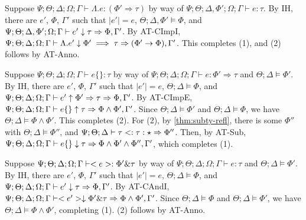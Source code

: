   \item[(T-CImpI)] Suppose
  $\Psi ; \Theta ; \Delta ; \Omega ; \Gamma \vdash \Lambda .e : (\Phi' \Rightarrow \tau)$ by way of
  $\Psi ; \Theta ; \Delta,\Phi' ; \Omega ; \Gamma \vdash e : \tau$.
  By IH, there are $e'$, $\Phi$, $\Gamma'$ such that
  $|e'| = e$,
  $\Theta ; \Delta,\Phi' \vDash \Phi$, and
  $\Psi ; \Theta ; \Delta,\Phi'; \Omega ; \Gamma \vdash e' \downarrow \tau \Rightarrow \Phi,\Gamma'$.
  By AT-CImpI,
  $\Psi ; \Theta ; \Delta ; \Omega ; \Gamma \vdash \Lambda. e' \downarrow \Phi' \implies \tau \Rightarrow (\Phi' \to \Phi),\Gamma'$.
  This completes (1), and (2) follows by AT-Anno.
  
  \item[(T-CImpE)] Suppose
  $\Psi ; \Theta ; \Delta ; \Omega ; \Gamma \vdash e \{\} : \tau$ by way of
  $\Psi ; \Theta ; \Delta ; \Omega ; \Gamma \vdash e : \Phi' \Rightarrow \tau$ and
  $\Theta ; \Delta \vDash \Phi'$.
  By IH, there are $e'$, $\Phi$, $\Gamma'$ such that
  $|e'| = e$,
  $\Theta ; \Delta \vDash \Phi$, and
  $\Psi ; \Theta ; \Delta ; \Omega ; \Gamma \vdash e' \uparrow \Phi' \Rightarrow \tau \Rightarrow \Phi,\Gamma'$.
  By AT-CImpE,
  $\Psi ; \Theta ; \Delta ; \Omega ; \Gamma \vdash e \{\} \uparrow \tau \Rightarrow \Phi \wedge \Phi',\Gamma'$.
  Since $\Theta ; \Delta \vDash \Phi'$ and $\Theta ; \Delta \vDash \Phi$, we have $\Theta ; \Delta \vDash \Phi \wedge \Phi'$.
  This completes (2). For (2),
  by \autoref{thm:subty-refl}, there is some $\Phi''$ with
  $\Theta ; \Delta \vDash \Phi''$, and
  $\Psi ; \Theta ; \Delta \vdash \tau <: \tau : \star \Rightarrow \Phi''$.
  Then, by AT-Sub,
  $\Psi ; \Theta ; \Delta ; \Omega ; \Gamma \vdash e \{\} \downarrow \tau \Rightarrow \Phi \wedge \Phi' \wedge \Phi'',\Gamma'$,
  which completes (1).
  
  \item[(T-CAndI)] Suppose
  $\Psi ; \Theta ; \Delta ; \Omega ; \Gamma \vdash <e> : \Phi' \& \tau$ by way of
  $\Psi ; \Theta ; \Delta ; \Omega ; \Gamma \vdash e : \tau$ and
  $\Theta ; \Delta \vDash \Phi'$.
  By IH, there are $e'$, $\Phi$, $\Gamma'$ such that
  $|e'| = e$,
  $\Theta ; \Delta \vDash \Phi$, and
  $\Psi  ; \Theta ; \Delta ; \Omega ; \Gamma \vdash e' \downarrow \tau \Rightarrow \Phi,\Gamma'$.
  By AT-CAndI,
  $\Psi; \Theta ; \Delta ; \Omega ; \Gamma \vdash <e'> \downarrow \Phi' \& \tau \Rightarrow \Phi \wedge \Phi',\Gamma'$.
  Since $\Theta ; \Delta \vDash \Phi$ and $\Theta ; \Delta \vDash \Phi'$, we have $\Theta ; \Delta \vDash \Phi \wedge \Phi'$,
  completing (1). (2) follows by AT-Anno.
  
